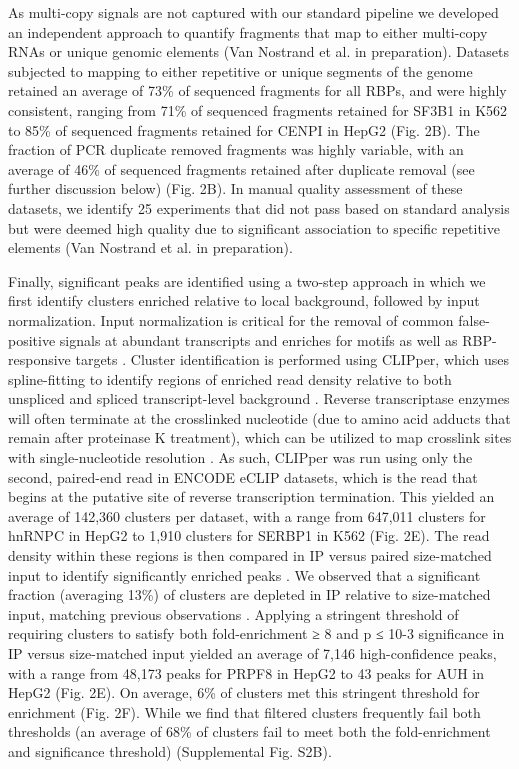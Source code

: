 As multi-copy signals are not captured with our standard pipeline we developed an independent approach to quantify fragments that map to either multi-copy RNAs or unique genomic elements (Van Nostrand et al. in preparation). Datasets subjected to mapping to either repetitive or unique segments of the genome retained an average of 73\% of sequenced fragments for all RBPs, and were highly consistent, ranging from 71\% of sequenced fragments retained for SF3B1 in K562 to 85\% of sequenced fragments retained for CENPI in HepG2 (Fig. 2B). The fraction of PCR duplicate removed fragments was highly variable, with an average of 46\% of sequenced fragments retained after duplicate removal (see further discussion below) (Fig. 2B). In manual quality assessment of these datasets, we identify 25 experiments that did not pass based on standard analysis but were deemed high quality due to significant association to specific repetitive elements (Van Nostrand et al. in preparation).

Finally, significant peaks are identified using a two-step approach in which we first identify clusters enriched relative to local background, followed by input normalization. Input normalization is critical for the removal of common false-positive signals at abundant transcripts and enriches for motifs as well as RBP-responsive targets \cite{VanNostrand2016}. Cluster identification is performed using CLIPper, which uses spline-fitting to identify regions of enriched read density relative to both unspliced and spliced transcript-level background \cite{Lovci2013}. Reverse transcriptase enzymes will often terminate at the crosslinked nucleotide (due to amino acid adducts that remain after proteinase K treatment), which can be utilized to map crosslink sites with single-nucleotide resolution \cite{Konig2010}. As such, CLIPper was run using only the second, paired-end read in ENCODE eCLIP datasets, which is the read that begins at the putative site of reverse transcription termination. This yielded an average of 142,360 clusters per dataset, with a range from 647,011 clusters for hnRNPC in HepG2 to 1,910 clusters for SERBP1 in K562 (Fig. 2E). The read density within these regions is then compared in IP versus paired size-matched input to identify significantly enriched peaks \cite{VanNostrand2016}. We observed that a significant fraction (averaging 13\%) of clusters are depleted in IP relative to size-matched input, matching previous observations \cite{VanNostrand2016}. Applying a stringent threshold of requiring clusters to satisfy both fold-enrichment ≥ 8 and p ≤ 10-3 significance in IP versus size-matched input yielded an average of 7,146 high-confidence peaks, with a range from 48,173 peaks for PRPF8 in HepG2 to 43 peaks for AUH in HepG2 (Fig. 2E). On average, 6\% of clusters met this stringent threshold for enrichment (Fig. 2F). While we find that filtered clusters frequently fail both thresholds (an average of 68\% of clusters fail to meet both the fold-enrichment and significance threshold) (Supplemental Fig. S2B).

